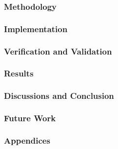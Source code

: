 \documentclass[12pt,twoside]{article}
\begin{document}
\subsubsection{Methodology}
\label{section:ReadersGuide_Methodology}
\subsubsection{Implementation}
\label{section:ReadersGuide_Implementation}
\subsubsection{Verification and Validation}
\label{section:ReadersGuide_VerificationAndValidation}
\subsubsection{Results}
\label{section:ReadersGuide_Results}
\subsubsection{Discussions and Conclusion}
\label{section:ReadersGuide_DiscussionsAndConclusion}
\subsubsection{Future Work}
\label{section:ReadersGuide_FutureWork}
\subsubsection{Appendices}
\label{section:ReadersGuide_Appendices}
\end{document}
